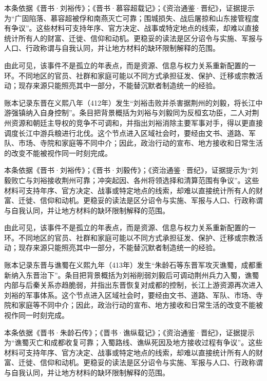 本条依据《晋书·刘裕传》；《晋书·慕容超载记》；《资治通鉴·晋纪》，证据提示为“广固陷落、慕容超被俘和南燕灭亡可靠；围城损失、战后屠掠和山东接管程度有争议”。这些材料可支持年序、官方决定、战事或特定地点的线索，却难以直接统计所有人的财富、迁徙、信仰和动机。更稳妥的读法是区分诏令与实施、军报与人口、行政称谓与自我认同，并让地方材料的缺环限制解释的范围。

由此可见，该事件不是孤立的年表点，而是资源、信息与权力关系重新配置的一环。不同地区的官员、社群和家庭可能以不同方式承担征发、保护、迁移或宗教活动；现存来源只能照亮其中一部分，不能替沉默者制造统一的经验。

账本记录东晋在义熙八年（412年）发生“刘裕击败并杀害据荆州的刘毅，将长江中游强镇纳入自身控制”。条目把背景概括为刘裕与刘毅同为反桓玄功臣，二人对荆州资源和朝廷主导权的竞争不可调和，并指出刘裕消除主要军事对手，得以更直接调度长江中游兵粮进行北伐。这个节点进入区域社会时，要经由文书、道路、军队、市场、寺院和家庭等不同中介；因此，政治行动的宣布、地方接收和日常生活的改变不能被视作同一时刻完成。

本条依据《晋书·刘裕传》；《晋书·刘毅传》；《资治通鉴·晋纪》，证据提示为“刘毅败亡与刘裕接收荆州可靠；冲突起因、各州将领选择和清算范围有争议”。这些材料可支持年序、官方决定、战事或特定地点的线索，却难以直接统计所有人的财富、迁徙、信仰和动机。更稳妥的读法是区分诏令与实施、军报与人口、行政称谓与自我认同，并让地方材料的缺环限制解释的范围。

由此可见，该事件不是孤立的年表点，而是资源、信息与权力关系重新配置的一环。不同地区的官员、社群和家庭可能以不同方式承担征发、保护、迁移或宗教活动；现存来源只能照亮其中一部分，不能替沉默者制造统一的经验。

账本记录东晋与谯蜀在义熙九年（413年）发生“朱龄石等东晋军攻灭谯蜀，成都重新纳入东晋治下”。条目把背景概括为刘裕削弱刘毅后可调动荆州兵力入蜀，谯蜀内部与后秦关系亦趋脆弱，并指出东晋恢复对成都的控制，长江上游资源再次进入刘裕的军事体系。这个节点进入区域社会时，要经由文书、道路、军队、市场、寺院和家庭等不同中介；因此，政治行动的宣布、地方接收和日常生活的改变不能被视作同一时刻完成。

本条依据《晋书·朱龄石传》；《晋书·谯纵载记》；《资治通鉴·晋纪》，证据提示为“谯蜀灭亡和成都收复可靠；入蜀路线、谯纵死因及地方接收过程有争议”。这些材料可支持年序、官方决定、战事或特定地点的线索，却难以直接统计所有人的财富、迁徙、信仰和动机。更稳妥的读法是区分诏令与实施、军报与人口、行政称谓与自我认同，并让地方材料的缺环限制解释的范围。

